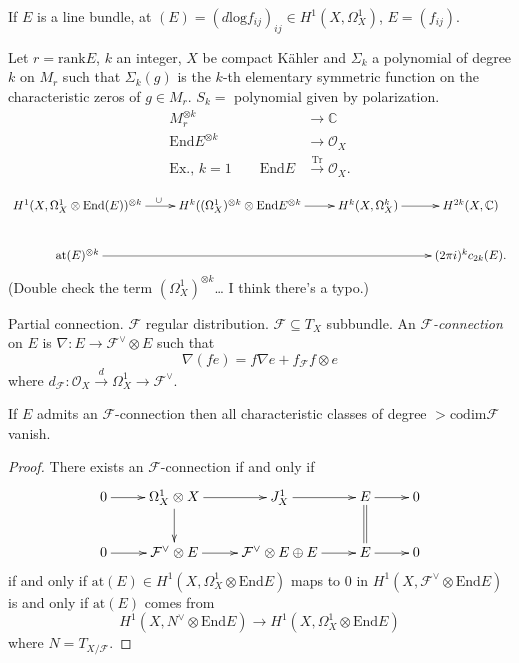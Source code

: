 \begin{example}
\label{example-line-bundl-holom-conne}
If $E$ is a line bundle, at
$(E)=(d\text{log}f_{ij})_{ij}
\in H^1(X,\Omega_X^1)$, $E=(f_{ij})$.
\end{example}

\begin{theorem}[Atiyah, '57]
\label{theorem-atiyah-57}
Let $r =\text{rank}E$, $k$ an integer, $X$ be
compact Kähler
and $\Sigma_k$ a polynomial of degree $k$ on
$M_r$
such that  $\Sigma_k(g)$ is the $k$-th
elementary
symmetric function on the characteristic
zeros of
$g \in M_r$. $S_k=$ polynomial given by
polarization.
$$
\begin{aligned}
M_r^{\otimes k}&\to \mathbb{C}\\
\text{End}E^{\otimes k}& \to \mathcal{O}_X\\
\text{Ex., $k=1$}\qquad
\text{End}E&\xrightarrow{\text{Tr}}
\mathcal{O}_X.
\end{aligned}
$$

$$
\xymatrix{
H^1(X,\Omega_X^1 \otimes
\text{End}(E))^{\otimes k}\ar[r]^{\cup }
&H^k((\Omega^1_X)^{\otimes k}\otimes
\text{End}E^{\otimes k}\ar[r]
&H^k(X,\Omega_X^k)\ar[r]
&H^{2k}(X,\mathbb{C})\\
\text{at}(E)^{\otimes k}\ar[rrr]
&&&(2\pi i)^kc_{2k}(E).
}
$$
(Double check the term $(\Omega^1_X)^{\otimes
k}$…
I think there's a typo.)

Partial connection. $\mathcal{F}$ regular
distribution.
$\mathcal{F} \subseteq T_X$ subbundle.
An {\it $\mathcal{F}$-connection} on $E$ is
$\nabla:E \to \mathcal{F}^\vee \otimes E$
such that
$$
\nabla(fe)=f\nabla e+f_{\mathcal{F}}f \otimes
e
$$
where
$d_{\mathcal{F}}:\mathcal{O}_X\xrightarrow{d}
\Omega_X^1
\to\mathcal{F}^\vee$.
\end{theorem}

\begin{proposition}
\label{proposition-bott-baum}
If $E$ admits an $\mathcal{F}$-connection
then all characteristic
classes of degree  $>\text{codim}\mathcal{F}$
vanish.
\end{proposition}

\begin{proof}
There exists an $\mathcal{F}$-connection if
and only if
$$
\xymatrix{
0\ar[r]&\Omega_X^1 \otimes
X\ar[r]\ar[d]&J_X^1\ar[r]&E\ar@{=}[d]\ar[r]&
0\\
0\ar[r]&\mathcal{F}^\vee\otimes E\ar[r]&
\mathcal{F}^\vee \otimes E \oplus E\ar[r]&
E\ar[r]&0
}
$$
if and only if $\text{at}(E) \in
H^1(X,\Omega_X^1\otimes\text{End}E)$
maps to 0 in
$H^1(X,\mathcal{F}^\vee\otimes\text{End}E)$
is and only if $\text{at}(E)$ comes from
$$
H^1(X,N^\vee\otimes\text{End}E)\to
H^1(X,\Omega_X^1\otimes\text{End}E)
$$
where $N=T_{X/\mathcal{F}}$.
\end{proof}

